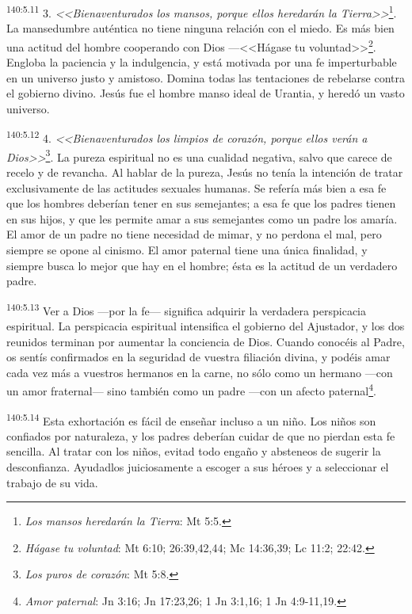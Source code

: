 \par 
\textsuperscript{140:5.11} 3. \textit{<<Bienaventurados los mansos, porque ellos heredarán la Tierra>>}\footnote{\textit{Los mansos heredarán la Tierra}: Mt 5:5.}. La mansedumbre auténtica no tiene ninguna relación con el miedo. Es más bien una actitud del hombre cooperando con Dios ---<<Hágase tu voluntad>>\footnote{\textit{Hágase tu voluntad}: Mt 6:10; 26:39,42,44; Mc 14:36,39; Lc 11:2; 22:42.}. Engloba la paciencia y la indulgencia, y está motivada por una fe imperturbable en un universo justo y amistoso. Domina todas las tentaciones de rebelarse contra el gobierno divino. Jesús fue el hombre manso ideal de Urantia, y heredó un vasto universo.

\par 
\textsuperscript{140:5.12} 4. \textit{<<Bienaventurados los limpios de corazón, porque ellos verán a Dios>>}\footnote{\textit{Los puros de corazón}: Mt 5:8.}. La pureza espiritual no es una cualidad negativa, salvo que carece de recelo y de revancha. Al hablar de la pureza, Jesús no tenía la intención de tratar exclusivamente de las actitudes sexuales humanas. Se refería más bien a esa fe que los hombres deberían tener en sus semejantes; a esa fe que los padres tienen en sus hijos, y que les permite amar a sus semejantes como un padre los amaría. El amor de un padre no tiene necesidad de mimar, y no perdona el mal, pero siempre se opone al cinismo. El amor paternal tiene una única finalidad, y siempre busca lo mejor que hay en el hombre; ésta es la actitud de un verdadero padre.

\par 
\textsuperscript{140:5.13} Ver a Dios ---por la fe--- significa adquirir la verdadera perspicacia espiritual. La perspicacia espiritual intensifica el gobierno del Ajustador, y los dos reunidos terminan por aumentar la conciencia de Dios. Cuando conocéis al Padre, os sentís confirmados en la seguridad de vuestra filiación divina, y podéis amar cada vez más a vuestros hermanos en la carne, no sólo como un hermano ---con un amor fraternal--- sino también como un padre ---con un afecto paternal\footnote{\textit{Amor paternal}: Jn 3:16; Jn 17:23,26; 1 Jn 3:1,16; 1 Jn 4:9-11,19.}.

\par 
\textsuperscript{140:5.14} Esta exhortación es fácil de enseñar incluso a un niño. Los niños son confiados por naturaleza, y los padres deberían cuidar de que no pierdan esta fe sencilla. Al tratar con los niños, evitad todo engaño y absteneos de sugerir la desconfianza. Ayudadlos juiciosamente a escoger a sus héroes y a seleccionar el trabajo de su vida.


